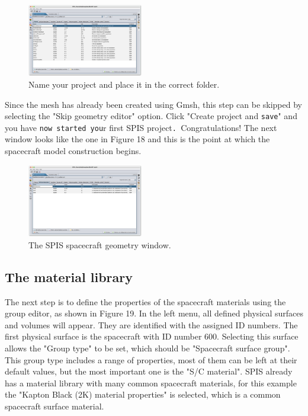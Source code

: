 \documentclass[a4paper, 11pt]{article}
\begin{document}
\begin{figure}[!ht]
    \centering
    \includegraphics[width=0.45\textwidth]{fig17.jpg}
    \caption{Name your project and place it in the correct folder.}
\end{figure}

Since the mesh has already been created using Gmsh, this step can be skipped by selecting the "Skip geometry editor" option. Click "Create project and \verb|save|" and you have \verb|now started you|r first SPIS project\verb|. |Congratulations! The next window looks like the one in Figure 18 and this is the point at which the spacecraft model construction begins.

\begin{figure}[!ht]
    \centering
    \includegraphics[width=0.45\textwidth]{fig18.jpg}
    \caption{The SPIS spacecraft geometry window.}
\end{figure}

\subsection{The material library} %

The next step is to define the properties of the spacecraft materials using the group editor, as shown in Figure 19. In the left menu, all defined physical surfaces and volumes will appear. They are identified with the assigned ID numbers. The first physical surface is the spacecraft with ID number 600. Selecting this surface allows the "Group type" to be set, which should be "Spacecraft surface group". This group type includes a range of properties, most of them can be left at their default values, but the most important one is the "S/C material". SPIS already has a material library with many common spacecraft materials, for this example the "Kapton Black (2K) material properties" is selected, which is a common spacecraft surface material.
\end{document}
